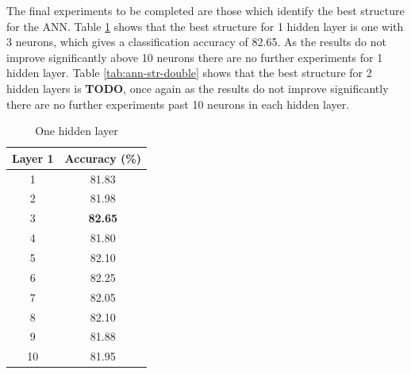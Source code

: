 \documentclass[12pt]{article}
\begin{document}
      The final experiments to be completed are those which identify the best structure for the ANN. Table \ref{tab:ann-str-single} shows that the best structure for 1 hidden layer is one with 3 neurons, which gives a classification accuracy of 82.65. As the results do not improve significantly above 10 neurons there are no further experiments for 1 hidden layer. Table \ref{tab:ann-str-double} shows that the best structure for 2 hidden layers is \textbf{TODO}, once again as the results do not improve significantly there are no further experiments past 10 neurons in each hidden layer.

      \begin{table}[H]
        \centering
        \caption{One hidden layer}
        \begin{tabular}{c|c}
          \toprule
          Layer 1 & Accuracy (\%) \\
          \midrule
          1     & 81.83 \\
          2     & 81.98 \\
          3     & \textbf{82.65} \\
          4     & 81.80 \\
          5     & 82.10 \\
          6     & 82.25 \\
          7     & 82.05 \\
          8     & 82.10 \\
          9     & 81.88 \\
          10    & 81.95 \\
          \bottomrule
        \end{tabular}
        \label{tab:ann-str-single}
      \end{table}
\end{document}
